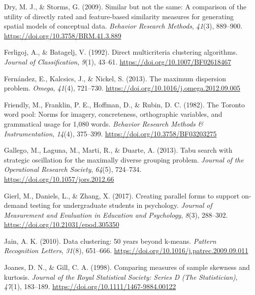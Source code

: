 \documentclass[
  man,floatsintext]{apa7}
\newlength{\cslhangindent}
\newlength{\cslentryspacingunit} %
\newenvironment{CSLReferences}[2] %
 {%
  \setlength{\parindent}{0pt}
  \ifodd #1
  \let\oldpar\par
  \def\par{\hangindent=\cslhangindent\oldpar}
  \fi
  \setlength{\parskip}{#2\cslentryspacingunit}
 }%
 {}
\begin{document}
\begin{CSLReferences}{1}{0}
\leavevmode{}%
Dry, M. J., \& Storms, G. (2009). Similar but not the same: A comparison of the utility of directly rated and feature-based similarity measures for generating spatial models of conceptual data. \emph{Behavior Research Methods}, \emph{41}(3), 889--900. \url{https://doi.org/10.3758/BRM.41.3.889}

\leavevmode{}%
Ferligoj, A., \& Batagelj, V. (1992). Direct multicriteria clustering algorithms. \emph{Journal of Classification}, \emph{9}(1), 43--61. \url{https://doi.org/10.1007/BF02618467}

\leavevmode{}%
Fernández, E., Kalcsics, J., \& Nickel, S. (2013). The maximum dispersion problem. \emph{Omega}, \emph{41}(4), 721--730. \url{https://doi.org/10.1016/j.omega.2012.09.005}

\leavevmode{}%
Friendly, M., Franklin, P. E., Hoffman, D., \& Rubin, D. C. (1982). The {Toronto} word pool: Norms for imagery, concreteness, orthographic variables, and grammatical usage for 1,080 words. \emph{Behavior Research Methods \& Instrumentation}, \emph{14}(4), 375--399. \url{https://doi.org/10.3758/BF03203275}

\leavevmode{}%
Gallego, M., Laguna, M., Marti, R., \& Duarte, A. (2013). Tabu search with strategic oscillation for the maximally diverse grouping problem. \emph{Journal of the Operational Research Society}, \emph{64}(5), 724--734. \url{https://doi.org/10.1057/jors.2012.66}

\leavevmode{}%
Gierl, M., Daniels, L., \& Zhang, X. (2017). Creating parallel forms to support on-demand testing for undergraduate students in psychology. \emph{Journal of Measurement and Evaluation in Education and Psychology}, \emph{8}(3), 288--302. \url{https://doi.org/10.21031/epod.305350}

\leavevmode{}%
Jain, A. K. (2010). Data clustering: 50 years beyond k-means. \emph{Pattern Recognition Letters}, \emph{31}(8), 651--666. \url{https://doi.org/10.1016/j.patrec.2009.09.011}

\leavevmode{}%
Joanes, D. N., \& Gill, C. A. (1998). Comparing measures of sample skewness and kurtosis. \emph{Journal of the Royal Statistical Society: Series D (The Statistician)}, \emph{47}(1), 183--189. \url{https://doi.org/10.1111/1467-9884.00122}


\end{CSLReferences}
\end{document}
